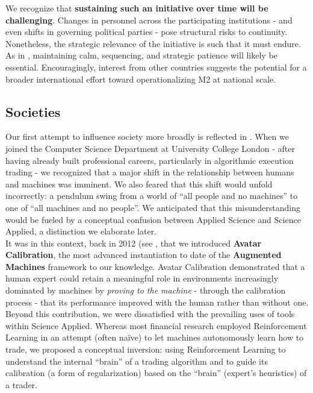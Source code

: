 \documentclass{article}
\begin{document}
We recognize that \textbf{sustaining such an initiative over time will be challenging}. Changes in personnel across the participating institutions - and even shifts in governing political parties - pose structural risks to continuity. Nonetheless, the strategic relevance of the initiative is such that it must endure. As in \cite{ASI}, maintaining calm, sequencing, and strategic patience will likely be essential. Encouragingly, interest from other countries suggests the potential for a broader international effort toward operationalizing M2 at national scale.\\


\subsection{Societies}
\label{subsection: Societies}
Our first attempt to influence society more broadly is reflected in \cite{book}. When we joined the Computer Science Department at University College London - after having already built professional careers, particularly in algorithmic execution trading - we recognized that a major shift in the relationship between humans and machines was imminent. We also feared that this shift would unfold incorrectly: a pendulum swing from a world of “all people and no machines” to one of “all machines and no people”. We anticipated that this misunderstanding would be fueled by a conceptual confusion between Applied Science and Science Applied, a distinction we elaborate later.\\

It was in this context, back in 2012 (see \cite{book}, that we introduced \textbf{Avatar Calibration}, the most advanced instantiation to date of the \textbf{Augmented Machines} framework to our knowledge. Avatar Calibration demonstrated that a human expert could retain a meaningful role in environments increasingly dominated by machines by \textit{proving to the machine} - through the calibration process - that its performance improved with the human rather than without one. Beyond this contribution, we were dissatisfied with the prevailing uses of tools within Science Applied. Whereas most financial research employed Reinforcement Learning in an attempt (often naïve) to let machines autonomously learn how to trade, we proposed a conceptual inversion: using Reinforcement Learning to understand the internal “brain” of a trading algorithm and to guide its calibration (a form of regularization) based on the “brain” (expert’s heuristics) of a trader.\\
\end{document}
